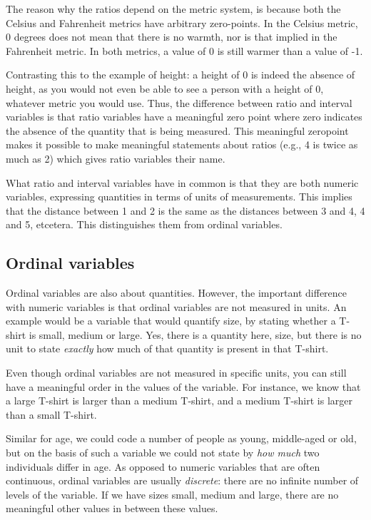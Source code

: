 \documentclass[]{book}\usepackage[]{graphicx}\usepackage[]{color}
\begin{document}
The reason why the ratios depend on the metric system, is because both the Celsius and Fahrenheit metrics have arbitrary zero-points. In the Celsius metric, 0 degrees does not mean that there is no warmth, nor is that implied in the Fahrenheit metric. In both metrics, a value of 0 is still warmer than a value of -1. 

Contrasting this to the example of height: a height of 0 is indeed the absence of height, as you would not even be able to see a person with a height of 0, whatever metric you would use. Thus, the difference between ratio and interval variables is that ratio variables have a meaningful zero point where zero indicates the absence of the quantity that is being measured. This meaningful zeropoint makes it possible to make meaningful statements about ratios (e.g., 4 is twice as much as 2) which gives ratio variables their name.

What ratio and interval variables have in common is that they are both numeric variables, expressing quantities in terms of units of measurements. This implies that the distance between 1 and 2 is the same as the distances between 3 and 4, 4 and 5, etcetera. This distinguishes them from ordinal variables. 




\subsection{Ordinal variables}

Ordinal variables are also about quantities. However, the important difference with numeric variables is that ordinal variables are not measured in units. An example would be a variable that would quantify size, by stating whether a T-shirt is small, medium or large. Yes, there is a quantity here, size, but there is no unit to state \textit{exactly} how much of that quantity is present in that T-shirt.

Even though ordinal variables are not measured in specific units, you can still have a meaningful order in the values of the variable. For instance, we know that a large T-shirt is larger than a medium T-shirt, and a medium T-shirt is larger than a small T-shirt.

Similar for age, we could code a number of people as young, middle-aged or old, but on the basis of such a variable we could not state by \textit{how much} two individuals differ in age. As opposed to numeric variables that are often continuous, ordinal variables are usually \textit{discrete}: there are no infinite number of levels of the variable. If we have sizes small, medium and large, there are no meaningful other values in between these values.
\end{document}
